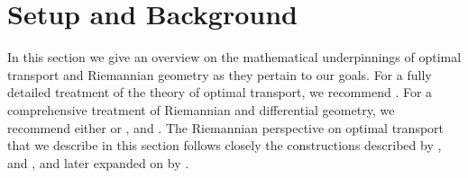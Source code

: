 \documentclass[11pt]{article}
\begin{document}

\section{Setup and Background}\label{sec:background}

In this section we give an overview on the mathematical underpinnings of optimal transport and Riemannian geometry as they pertain to our goals. For a fully detailed treatment of the theory of optimal transport, we recommend \citet{villani2009optimal}. For a comprehensive treatment of Riemannian and differential geometry, we recommend either \citet{lee2018introduction} or \citet{petersen2006riemannian}, and \citet{do2016differential}. The Riemannian perspective on optimal transport that we describe in this section follows closely the constructions described by \citet{otto2001geometry}, \citet{gigli2012second} and \citet{lott2006some}, and later expanded on by \citet{clancy2021interpolating}.  
\end{document}
